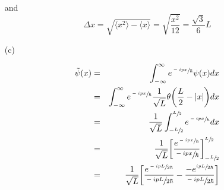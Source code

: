 \documentclass[11pt,a4paper]{article}
\newcommand{\bra}{\langle}
\newcommand{\ket}{\rangle}
\begin{document}
\begin{enumerate}
    and
    \begin{equation}
        \Delta x=\sqrt{\bra x^2 \ket-\bra x \ket}=\sqrt{\frac{x^2}{12}}=\frac{\sqrt{3}}{6}L
    \end{equation}

    \item[(c)]
    
    \begin{eqnarray}
        \tilde{\psi}(x)
        &=&\int_{-\infty}^{\infty}e^{\sfrac{-ipx}{\hbar}}\psi(x)dx\\
        &=&\int_{-\infty}^{\infty}e^{\sfrac{-ipx}{\hbar}}\frac{1}{\sqrt{L}}\theta\bigg(\frac{L}{2}-|x|\bigg)dx\\
        &=&\frac{1}{\sqrt{L}}\int_{-\sfrac{L}{2}}^{\sfrac{L}{2}}e^{\sfrac{-ipx}{\hbar}}dx\\
        &=&\frac{1}{\sqrt{L}}\bigg[\frac{e^{\sfrac{-ipx}{\hbar}}}{\sfrac{-ipx}{\hbar}}\bigg]_{-\sfrac{L}{2}}^{\sfrac{L}{2}}\\
        &=&\frac{1}{\sqrt{L}}\bigg[\frac{e^{\sfrac{-ipL}{2\hbar}}}{\sfrac{-ipL}{2\hbar}}-\frac{-e^{\sfrac{ipL}{2\hbar}}}{\sfrac{-ipL}{2\hbar}}\bigg]\\
    \end{eqnarray}

\end{enumerate}
\end{document}
